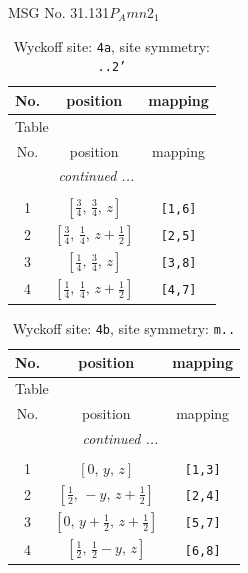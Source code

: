\documentclass[fleqn,8pt]{jsarticle}
\begin{document}
\setcounter{MaxMatrixCols}{32}

\renewcommand{\tablename}{Table~}
\renewcommand{\figurename}{Figure~}
\begin{center}
\LARGE
MSG No. 31.131\quad$P_{A}mn2_{1}$
\end{center}
\renewcommand{\arraystretch}{1.2}
\begin{longtable}{ccc}
\caption{Wyckoff site: {\tt 4a}, site symmetry: {\tt ..2'}}
 \\
 \hline \hline
No. & position & mapping \\ \hline \endfirsthead

\multicolumn{2}{l}{\tablename\ \thetable{}} \\
 \hline \hline
No. & position & mapping \\ \hline \endhead

 \hline \hline
\multicolumn{2}{r}{\footnotesize\it continued ...} \\ \endfoot

 \hline \hline
\multicolumn{2}{r}{} \\ \endlastfoot

1 & $\left[ \frac{3}{4},\, \frac{3}{4},\, z \right]$ & {\tt [1,6]} \\ \hline
2 & $\left[ \frac{3}{4},\, \frac{1}{4},\, z + \frac{1}{2} \right]$ & {\tt [2,5]} \\ \hline
3 & $\left[ \frac{1}{4},\, \frac{3}{4},\, z \right]$ & {\tt [3,8]} \\ \hline
4 & $\left[ \frac{1}{4},\, \frac{1}{4},\, z + \frac{1}{2} \right]$ & {\tt [4,7]} \\
\end{longtable}
\renewcommand{\arraystretch}{1.2}
\begin{longtable}{ccc}
\caption{Wyckoff site: {\tt 4b}, site symmetry: {\tt m..}}
 \\
 \hline \hline
No. & position & mapping \\ \hline \endfirsthead

\multicolumn{2}{l}{\tablename\ \thetable{}} \\
 \hline \hline
No. & position & mapping \\ \hline \endhead

 \hline \hline
\multicolumn{2}{r}{\footnotesize\it continued ...} \\ \endfoot

 \hline \hline
\multicolumn{2}{r}{} \\ \endlastfoot

1 & $\left[ 0,\, y,\, z \right]$ & {\tt [1,3]} \\ \hline
2 & $\left[ \frac{1}{2},\, - y,\, z + \frac{1}{2} \right]$ & {\tt [2,4]} \\ \hline
3 & $\left[ 0,\, y + \frac{1}{2},\, z + \frac{1}{2} \right]$ & {\tt [5,7]} \\ \hline
4 & $\left[ \frac{1}{2},\, \frac{1}{2} - y,\, z \right]$ & {\tt [6,8]} \\
\end{longtable}
\end{document}
